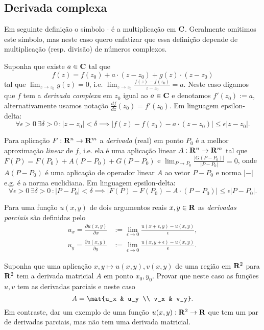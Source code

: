 \subsection{Derivada complexa}
Em seguinte definição o símbolo $\cdot$ é a multiplicação em $\mathbf{C}$.
Geralmente omitimos este símbolo, mas neste caso quero enfatizar que essa definição depende
de multiplicação (resp. divisão) de números complexos.
\begin{defin}
\label{d:derivada-complexa}
Suponha que existe $a\in \mathbf{C}$ tal que
\[ f(z) = f(z_0) + a \cdot (z-z_0) + g(z) \cdot (z-z_0) \]
tal que $\lim_{z\to z_0} g(z) = 0$,
i.e. $\lim_{z\to z_0} \frac{f(z)-f(z_0)}{z-z_0} = a$.
Neste caso digamos que $f$ tem a \emph{derivada complexa} em $z_0$ igual ao $a\in \mathbf{C}$
e denotamos $f'(z_0) := a$, alternativamente usamos notação $\frac{df}{dz}(z_0) = f'(z_0)$.
Em linguagem epsilon-delta:
\[ \forall\epsilon>0 \, \exists\delta>0 \, : |z-z_0|<\delta  \implies
|f(z) - f(z_0) - a \cdot (z-z_0)| \leq \epsilon |z-z_0|. \]
\end{defin}

\begin{defin}
Para aplicação $F: \mathbf{R}^n \to \mathbf{R}^m$ a \emph{derivada} (real) em ponto $P_0$
é a melhor aproximação \emph{linear} de $f$, i.e. ela é uma aplicação linear $A: \mathbf{R}^n \to \mathbf{R}^m$
tal que $F(P) = F(P_0) + A (P-P_0) + G(P-P_0)$ e $\lim_{P\to P_0} \frac{|G(P-P_0)|}{|P-P_0|} = 0$,
onde $A (P-P_0)$ é uma aplicação de operador linear $A$ ao vetor $P-P_0$
e norma $|-|$ e.g. é a norma euclidiana. Em linguagem epsilon-delta:
\[ \forall\epsilon>0 \, \exists\delta>0 \, : |P-P_0|<\delta  \implies
|F(P) - F(P_0) - A \cdot (P-P_0)| \leq \epsilon |P-P_0|. \]
\end{defin}

\begin{defin}
Para uma função $u(x,y)$ de dois argumentos reais $x,y\in\mathbf{R}$
as \emph{derivadas parciais} são definidas pelo
\begin{align*}
u_x = \frac{\partial u(x,y)}{\partial x} &:= \lim_{\epsilon\to 0} \frac{u(x+\epsilon,y)-u(x,y)}{\epsilon},\\
u_y = \frac{\partial u(x,y)}{\partial y} &:= \lim_{\epsilon\to 0} \frac{u(x,y+\epsilon)-u(x,y)}{\epsilon}.
\end{align*}
\end{defin}

\begin{problema}
Suponha que uma aplicação $x,y \mapsto u(x,y),v(x,y)$ de uma região em $\mathbf{R}^2$ para $\mathbf{R}^2$
tem a derivada matricial $A$ em ponto $x_0,y_0$. Provar que neste caso
as funções $u,v$ tem as derivadas parciais e neste caso
\[ A = \mat{u_x & u_y \\ v_x & v_y}. \]
Em contraste, dar um exemplo de uma função $u(x,y) : \mathbf{R}^2 \to \mathbf{R}$ que tem um par de derivadas parciais,
mas não tem uma derivada matricial.
\end{problema}

